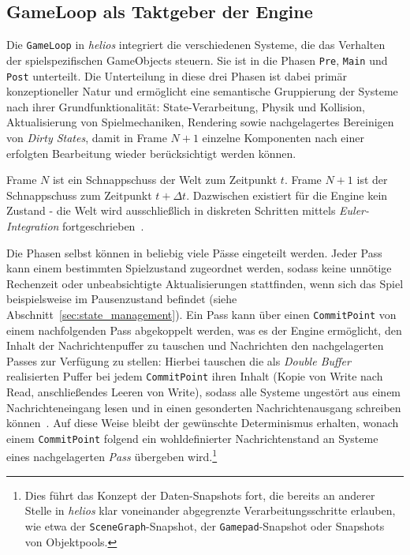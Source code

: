 \subsection{GameLoop als Taktgeber der Engine}\label{sec:runtime_gameloop}

Die \texttt{GameLoop} in \textit{helios} integriert die verschiedenen Systeme, die das Verhalten der spielspezifischen GameObjects steuern.
Sie ist in die Phasen \texttt{Pre}, \texttt{Main} und \texttt{Post} unterteilt.
Die Unterteilung in diese drei Phasen ist dabei primär konzeptioneller Natur und ermöglicht eine semantische Gruppierung der Systeme nach ihrer Grundfunktionalität: State-Verarbeitung, Physik und Kollision, Aktualisierung von Spielmechaniken, Rendering sowie nachgelagertes Bereinigen von \textit{Dirty States}, damit in Frame $N+1$ einzelne Komponenten nach einer erfolgten Bearbeitung wieder berücksichtigt werden können.

\vspace{5mm}
\begin{tcolorbox}[title={Frame-Semantik}]
    Frame $N$ ist ein Schnappschuss der Welt zum Zeitpunkt $t$.
    Frame $N+1$ ist der Schnappschuss zum Zeitpunkt $t + \Delta t$.
    Dazwischen existiert für die Engine kein Zustand - die Welt wird ausschließlich in diskreten Schritten mittels \textit{Euler-Integration} fortgeschrieben~\cite[S. 766-769]{Ebe10}.
\end{tcolorbox}
\vspace{5mm}

Die Phasen selbst können in beliebig viele Pässe eingeteilt werden.
Jeder Pass kann einem bestimmten Spielzustand zugeordnet werden, sodass keine unnötige Rechenzeit oder unbeabsichtigte Aktualisierungen stattfinden, wenn sich das Spiel beispielsweise im Pausenzustand befindet (siehe Abschnitt~\ref{sec:state_management}).
Ein Pass kann über einen \texttt{CommitPoint} von einem nachfolgenden Pass abgekoppelt werden, was es der Engine ermöglicht, den Inhalt der Nachrichtenpuffer zu tauschen und Nachrichten den nachgelagerten Passes zur Verfügung zu stellen:
Hierbei tauschen die als \textit{Double Buffer} realisierten Puffer bei jedem \texttt{CommitPoint} ihren Inhalt (Kopie von Write nach Read, anschließendes Leeren von Write), sodass alle Systeme ungestört aus einem Nachrichteneingang lesen und in einen gesonderten Nachrichtenausgang schreiben können~\cite[S. 110]{Nys14}.
Auf diese Weise bleibt der gewünschte Determinismus erhalten, wonach einem \texttt{CommitPoint} folgend ein wohldefinierter Nachrichtenstand an Systeme eines nachgelagerten \textit{Pass} übergeben wird.\footnote{
Dies führt das Konzept der Daten-Snapshots fort, die bereits an anderer Stelle in \textit{helios} klar voneinander abgegrenzte Verarbeitungsschritte erlauben, wie etwa der \texttt{SceneGraph}-Snapshot, der \texttt{Gamepad}-Snapshot oder Snapshots von Objektpools.
}

